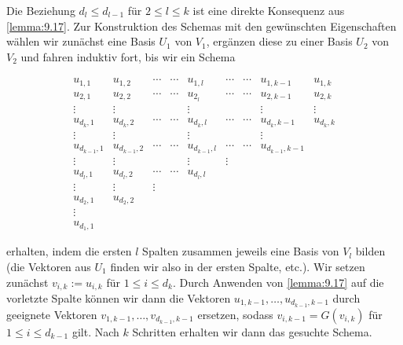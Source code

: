 \begin{beweis}
	Die Beziehung $d_l \leq d_{l-1}$ für $2 \leq l \leq k$ ist eine direkte Konsequenz aus \autoref{lemma:9.17}.
	Zur Konstruktion des Schemas mit den gewünschten Eigenschaften wählen wir zunächst eine Basis $U_1$ von $V_1$, ergänzen diese zu einer Basis $U_2$ von $V_2$ und fahren induktiv fort, bis wir ein Schema
	
	\[
		\begin{array}{ccccccccc}
		u_{1,1} & u_{1,2} & \cdots & \cdots & u_{1,l} & \cdots & \cdots & u_{1,k-1} & u_{1,k} \\ 
		u_{2,1} & u_{2,2} & \cdots & \cdots & u_{2_l} & \cdots & \cdots & u_{2,k-1} & u_{2,k} \\ 
		\vdots & \vdots &  &  & \vdots &  &  & \vdots & \vdots \\ 
		u_{d_k,1} & u_{d_k,2} & \cdots & \cdots & u_{d_k,l} & \cdots & \cdots & u_{d_k,k-1} & u_{d_k,k} \\ 
		\vdots & \vdots &  &  & \vdots &  &  & \vdots &  \\ 
		u_{d_{k-1},1} & u_{d_{k-1},2} & \cdots & \cdots & u_{d_{k-1},l} & \cdots & \cdots & u_{d_{k-1},k-1} &  \\ 
		\vdots & \vdots &  &  & \vdots & \vdots &  &  &  \\ 
		u_{d_l,1} & u_{d_l,2} & \cdots & \cdots & u_{d_l,l} &  &  &  &  \\ 
		\vdots & \vdots & \vdots &  &  &  &  &  &  \\ 
		u_{d_2,1} & u_{d_2,2} &  &  &  &  &  &  &  \\
		\vdots & & & & & & & & \\ 
		u_{d_1,1} &  &  &  &  &  &  &  & 
		\end{array}
	\]
	
	erhalten, indem die ersten $l$ Spalten zusammen jeweils eine Basis von $V_l$ bilden (die Vektoren aus $U_1$ finden wir also in der ersten Spalte, etc.).
	Wir setzen zunächst $v_{i,k} := u_{i,k}$ für $1 \leq i \leq d_k$.
	Durch Anwenden von \autoref{lemma:9.17} auf die vorletzte Spalte können wir dann die Vektoren $u_{1,k-1},\dots,u_{d_{k-1},k-1}$ durch geeignete Vektoren $v_{1,k-1},\dots,v_{d_{k-1},k-1}$ ersetzen, sodass $v_{i,k-1} = G(v_{i,k})$ für $1 \leq i \leq d_{k-1}$ gilt.
	Nach $k$ Schritten erhalten wir dann das gesuchte Schema.
	

\end{beweis}
